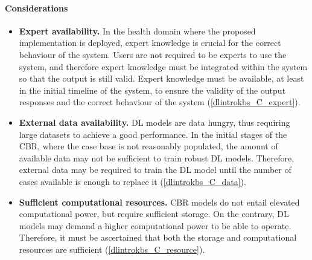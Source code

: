 \paragraph{Considerations}
\begin{itemize}
    \item \textbf{Expert availability.} In the health domain where the proposed implementation is deployed, expert knowledge is crucial for the correct behaviour of the system. Users are not required to be experts to use the system, and therefore expert knowledge must be integrated within the system so that the output is still valid. Expert knowledge must be available, at least in the initial timeline of the system, to ensure the validity of the output responses and the correct behaviour of the system (\ref{dlintrokbs_C_expert}).
    
    \item \textbf{External data availability.} DL models are data hungry, thus requiring large datasets to achieve a good performance. In the initial stages of the CBR, where the case base is not reasonably populated, the amount of available data may not be sufficient to train robust DL models. Therefore, external data may be required to train the DL model until the number of cases available is enough to replace it (\ref{dlintrokbs_C_data}).
    
    \item \textbf{Sufficient computational resources.} CBR models do not entail elevated computational power, but require sufficient storage. On the contrary, DL models may demand a higher computational power to be able to operate. Therefore, it must be ascertained that both the storage and computational resources are sufficient (\ref{dlintrokbs_C_resource}).
    
\end{itemize}
